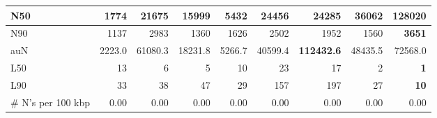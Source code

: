 \documentclass[12pt,a4paper]{article}
\begin{document}
\begin{table}[ht]
\begin{center}
\begin{tabular}{|l*{8}{|r}|}
N50 & 1774 & 21675 & 15999 & 5432 & 24456 & 24285 & 36062 & {\bf 128020} \\ \hline
N90 & 1137 & 2983 & 1360 & 1626 & 2502 & 1952 & 1560 & {\bf 3651} \\ \hline
auN & 2223.0 & 61080.3 & 18231.8 & 5266.7 & 40599.4 & {\bf 112432.6} & 48435.5 & 72568.0 \\ \hline
L50 & 13 & 6 & 5 & 10 & 23 & 17 & 2 & {\bf 1} \\ \hline
L90 & 33 & 38 & 47 & 29 & 157 & 197 & 27 & {\bf 10} \\ \hline
\# N's per 100 kbp & 0.00 & 0.00 & 0.00 & 0.00 & 0.00 & 0.00 & 0.00 & 0.00 \\ \hline
\end{tabular}
\end{center}
\end{table}
\end{document}
